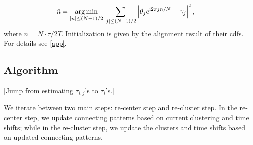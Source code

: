 	\begin{equation}
	\begin{aligned}\label{eq:time shift}
	\hat n&=
	\underset{|n|\leq (N-1)/2}{\arg\min}
	\sum_{|j|\leq (N-1)/2}
	\left| \theta_{j}e^{\complexunit 2\pi j n/N}
	-\gamma_{j} \right|^2
	,
	\end{aligned}
	\end{equation}
where $n=N\cdot\tau/2T$.
Initialization is given by the alignment result of their cdfs.
For details see \ref{app}.





\subsection{Algorithm}
[Jump from estimating $\tau_{i,j}$'s to $\tau_i$'s.]

\noindent
We iterate between two main steps: re-center step and re-cluster step.
In the re-center step, we update connecting patterns  based on current clustering  and time shifts; 
while in the re-cluster step, we update the clusters
and time shifts based on updated connecting patterns.

